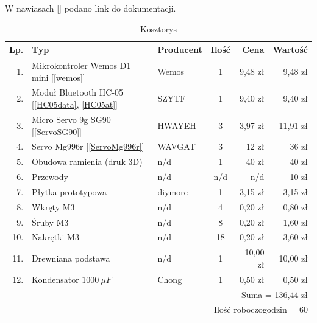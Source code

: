 \documentclass[11pt,titlepage,a4paper]{article}
\begin{document}
W nawiasach [] podano link do dokumentacji.

\begin{table}[h!]
    \begin{center}
        \begin{tabular}{|r|l|l|c|r|r|}
            \hline
            Lp. & Typ                                                  & Producent & Ilość & Cena     & Wartość  \\
            \hline
            1.  & Mikrokontroler Wemos D1 mini [\ref{wemos}]           & Wemos     & 1     & 9,48 zł  & 9,48 zł  \\
            2.  & Moduł Bluetooth HC-05 [\ref{HC05data}, \ref{HC05at}] & SZYTF     & 1     & 9,40 zł  & 9,40 zł  \\
            3.  & Micro Servo 9g SG90 [\ref{ServoSG90}]                & HWAYEH    & 3     & 3,97 zł  & 11,91 zł \\
            4.  & Servo Mg996r [\ref{ServoMg996r}]                     & WAVGAT    & 3     & 12 zł    & 36 zł    \\
            5.  & Obudowa ramienia (druk 3D)                           & n/d       & 1     & 40 zł    & 40 zł    \\
            6.  & Przewody                                             & n/d       & n/d   & n/d      & 10 zł    \\
            7.  & Płytka prototypowa                                   & diymore   & 1     & 3,15 zł  & 3,15 zł  \\
            8.  & Wkręty M3                                            & n/d       & 4     & 0,20 zł  & 0,80 zł  \\
            9.  & Śruby M3                                             & n/d       & 8     & 0,20 zł  & 1,60 zł  \\
            10. & Nakrętki M3                                          & n/d       & 18    & 0,20 zł  & 3,60 zł  \\
            11. & Drewniana podstawa                                   & n/d       & 1     & 10,00 zł & 10,00 zł \\
            12. & Kondensator $1000\ \mu F$                            & Chong     & 1     & 0,50 zł  & 0,50 zł  \\
            \hline
            \multicolumn{6}{|r|}{Suma = 136,44 zł}                                                               \\
            \hline
            \multicolumn{6}{|r|}{Ilość roboczogodzin = 60}                                                       \\
            \hline
        \end{tabular}
    \end{center}
    \caption{Kosztorys}
    \label{Kosztorys}
\end{table}
\end{document}
